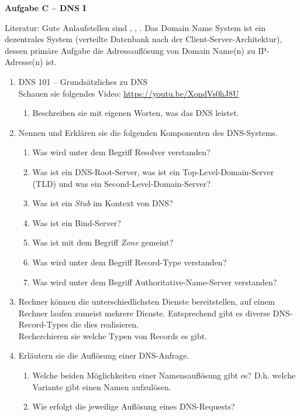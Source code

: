\documentclass[paper=a4,fontsize=11pt]{scrartcl}%
\numberwithin{equation}{section}
\begin{document}
\begin{center}
\Large{\textbf{Aufgabe C -- DNS I}}
\end{center}
Literatur:  Gute Anlaufstellen sind \cite[Kap. 2.5, S. 130ff]{Kurose2012}, \cite[Kap. 11, S. 511ff]{fall2011tcp}, \cite[Kap. 50, S. 825ff]{kozierok2005tcp}.
Das Domain Name System ist ein dezentrales System (verteilte Datenbank nach der Client-Server-Architektur), dessen primäre Aufgabe die Adressauflösung von Domain Name(n) zu IP-Adresse(n) ist.
\begin{enumerate}
	\item DNS 101 -- Grundsätzliches zu DNS\\
	Schauen sie folgendes Video: \url{https://youtu.be/XondVs0hJ8U}
	\begin{enumerate}
		\item Beschreiben sie mit eigenen Worten, was das DNS leistet.
	\end{enumerate}
	\item Nennen und Erklären sie die folgenden Komponenten des DNS-Systems.
	\begin{enumerate}
		\item Was wird unter dem Begriff Resolver verstanden?
		\item Was ist ein DNS-Root-Server, was ist ein Top-Level-Domain-Server (TLD) und was ein Second-Level-Domain-Server?
		\item Was ist ein \emph{Stub} im Kontext von DNS?
		\item Was ist ein Bind-Server?
		\item Was ist mit dem Begriff \emph{Zone} gemeint?
		\item Was wird unter dem Begriff Record-Type verstanden?
		\item Was wird unter dem Begriff Authoritative-Name-Server verstanden?
	\end{enumerate}
	\item Rechner können die unterschiedlichsten Dienste bereitstellen, auf einem Rechner laufen zumeist mehrere Dienste. Entsprechend gibt es diverse DNS-Record-Types die dies realisieren.\\
	Recherchieren sie welche Typen von Records es gibt.
	\item Erläutern sie die Auflösung einer DNS-Anfrage.
	\begin{enumerate}
		\item Welche beiden Möglichkeiten einer Namensauflösung gibt es? D.h. welche Variante gibt einen Namen aufzulösen.
		\item Wie erfolgt die jeweilige Auflösung eines DNS-Requests?

\end{enumerate}
\end{enumerate}
\end{document}

